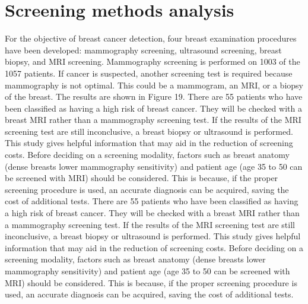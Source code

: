 \documentclass[10pt,a4paper,twoside]{article}
\begin{document}
\section{Screening methods analysis}
For the objective of breast cancer detection, four breast examination procedures have been developed: mammography screening, ultrasound screening, breast biopsy, and MRI screening.
Mammography screening is performed on 1003 of the 1057 patients. If cancer is suspected, another screening test is required because mammography is not optimal. This could be a mammogram, an MRI, or a biopsy of the breast. The results are shown in Figure 19.
\vspace{0.3cm}
There are 55 patients who have been classified as having a high risk of breast cancer. They will be checked with a breast MRI rather than a mammography screening test. If the results of the MRI screening test are still inconclusive, a breast biopsy or ultrasound is performed.
This study gives helpful information that may aid in the reduction of screening costs. Before deciding on a screening modality, factors such as breast anatomy (dense breasts lower mammography sensitivity) and patient age (age 35 to 50 can be screened with MRI) should be considered.
This is because, if the proper screening procedure is used, an accurate diagnosis can be acquired, saving the cost of additional tests.
\vspace{0.3cm}
There are 55 patients who have been classified as having a high risk of breast cancer. They will be checked with a breast MRI rather than a mammography screening test. If the results of the MRI screening test are still inconclusive, a breast biopsy or ultrasound is performed.
This study gives helpful information that may aid in the reduction of screening costs. Before deciding on a screening modality, factors such as breast anatomy (dense breasts lower mammography sensitivity) and patient age (age 35 to 50 can be screened with MRI) should be considered.
This is because, if the proper screening procedure is used, an accurate diagnosis can be acquired, saving the cost of additional tests.
\end{document}
